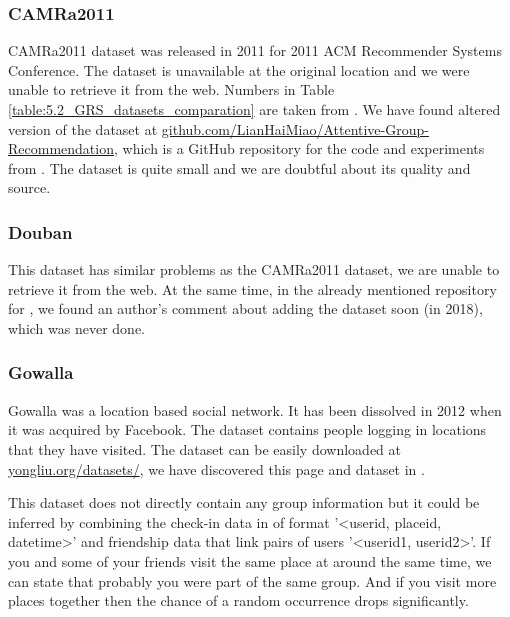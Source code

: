 \subsubsection{CAMRa2011} \label{subsubsec:04_group_datasets.overview.camra}
CAMRa2011 dataset was released in 2011 for 2011 ACM Recommender Systems Conference. The dataset is unavailable at the original location and we were unable to retrieve it from the web. Numbers in Table \ref{table:5.2_GRS_datasets_comparation} are taken from \cite{attentative_group_recommendation}. We have found altered version of the dataset at \href{https://github.com/LianHaiMiao/Attentive-Group-Recommendation}{github.com/LianHaiMiao/Attentive-Group-Recommendation}, which is a GitHub repository for the code and experiments from \cite{attentative_group_recommendation}. The dataset is quite small and we are doubtful about its quality and source.


\subsubsection{Douban} \label{subsubsec:04_group_datasets.overview.douban}
This dataset has similar problems as the CAMRa2011 dataset, we are unable to retrieve it from the web. At the same time, in the already mentioned repository for \cite{attentative_group_recommendation}, we found an author's comment about adding the dataset soon (in 2018), which was never done.


\subsubsection{Gowalla} \label{subsubsec:04_group_datasets.overview.gowalla}
Gowalla was a location based social network. It has been dissolved in 2012 when it was acquired by Facebook. The dataset contains people logging in locations that they have visited. The dataset can be easily downloaded at \href{https://www.yongliu.org/datasets/}{yongliu.org/datasets/}, we have discovered this page and dataset in \cite{gowalla_weeplaces_yelp}.

This dataset does not directly contain any group information but it could be inferred by combining the check-in data in of format '\textless userid, placeid, datetime\textgreater' and friendship data that link pairs of users '\textless userid1, userid2\textgreater'. If you and some of your friends visit the same place at around the same time, we can state that probably you were part of the same group. And if you visit more places together then the chance of a random occurrence drops significantly.


